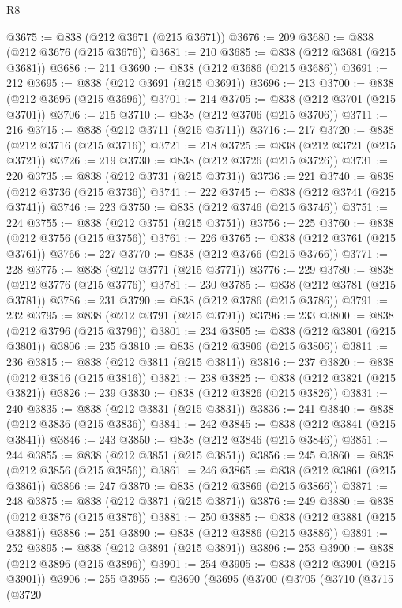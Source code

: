\begin{lexlean}{R8}
\begin{coremodule}
@3675 := @838 (@212 @3671 (@215 @3671))
@3676 := 209
@3680 := @838 (@212 @3676 (@215 @3676))
@3681 := 210
@3685 := @838 (@212 @3681 (@215 @3681))
@3686 := 211
@3690 := @838 (@212 @3686 (@215 @3686))
@3691 := 212
@3695 := @838 (@212 @3691 (@215 @3691))
@3696 := 213
@3700 := @838 (@212 @3696 (@215 @3696))
@3701 := 214
@3705 := @838 (@212 @3701 (@215 @3701))
@3706 := 215
@3710 := @838 (@212 @3706 (@215 @3706))
@3711 := 216
@3715 := @838 (@212 @3711 (@215 @3711))
@3716 := 217
@3720 := @838 (@212 @3716 (@215 @3716))
@3721 := 218
@3725 := @838 (@212 @3721 (@215 @3721))
@3726 := 219
@3730 := @838 (@212 @3726 (@215 @3726))
@3731 := 220
@3735 := @838 (@212 @3731 (@215 @3731))
@3736 := 221
@3740 := @838 (@212 @3736 (@215 @3736))
@3741 := 222
@3745 := @838 (@212 @3741 (@215 @3741))
@3746 := 223
@3750 := @838 (@212 @3746 (@215 @3746))
@3751 := 224
@3755 := @838 (@212 @3751 (@215 @3751))
@3756 := 225
@3760 := @838 (@212 @3756 (@215 @3756))
@3761 := 226
@3765 := @838 (@212 @3761 (@215 @3761))
@3766 := 227
@3770 := @838 (@212 @3766 (@215 @3766))
@3771 := 228
@3775 := @838 (@212 @3771 (@215 @3771))
@3776 := 229
@3780 := @838 (@212 @3776 (@215 @3776))
@3781 := 230
@3785 := @838 (@212 @3781 (@215 @3781))
@3786 := 231
@3790 := @838 (@212 @3786 (@215 @3786))
@3791 := 232
@3795 := @838 (@212 @3791 (@215 @3791))
@3796 := 233
@3800 := @838 (@212 @3796 (@215 @3796))
@3801 := 234
@3805 := @838 (@212 @3801 (@215 @3801))
@3806 := 235
@3810 := @838 (@212 @3806 (@215 @3806))
@3811 := 236
@3815 := @838 (@212 @3811 (@215 @3811))
@3816 := 237
@3820 := @838 (@212 @3816 (@215 @3816))
@3821 := 238
@3825 := @838 (@212 @3821 (@215 @3821))
@3826 := 239
@3830 := @838 (@212 @3826 (@215 @3826))
@3831 := 240
@3835 := @838 (@212 @3831 (@215 @3831))
@3836 := 241
@3840 := @838 (@212 @3836 (@215 @3836))
@3841 := 242
@3845 := @838 (@212 @3841 (@215 @3841))
@3846 := 243
@3850 := @838 (@212 @3846 (@215 @3846))
@3851 := 244
@3855 := @838 (@212 @3851 (@215 @3851))
@3856 := 245
@3860 := @838 (@212 @3856 (@215 @3856))
@3861 := 246
@3865 := @838 (@212 @3861 (@215 @3861))
@3866 := 247
@3870 := @838 (@212 @3866 (@215 @3866))
@3871 := 248
@3875 := @838 (@212 @3871 (@215 @3871))
@3876 := 249
@3880 := @838 (@212 @3876 (@215 @3876))
@3881 := 250
@3885 := @838 (@212 @3881 (@215 @3881))
@3886 := 251
@3890 := @838 (@212 @3886 (@215 @3886))
@3891 := 252
@3895 := @838 (@212 @3891 (@215 @3891))
@3896 := 253
@3900 := @838 (@212 @3896 (@215 @3896))
@3901 := 254
@3905 := @838 (@212 @3901 (@215 @3901))
@3906 := 255
@3955 := @3690
    (@3695
      (@3700
        (@3705
          (@3710
            (@3715
              (@3720

\end{coremodule}
\end{lexlean}
